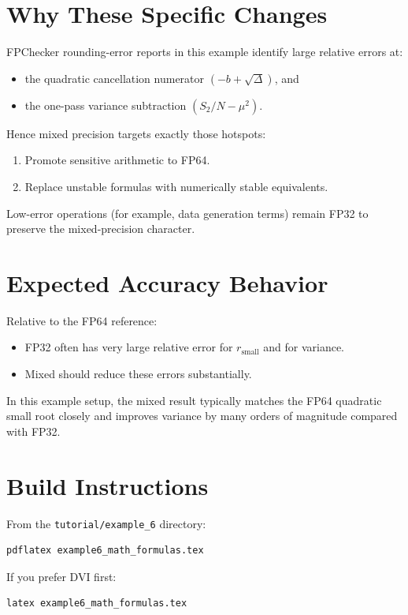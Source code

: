 \documentclass[11pt]{article}
\begin{document}
\section{Why These Specific Changes}
FPChecker rounding-error reports in this example identify large relative errors at:
\begin{itemize}
  \item the quadratic cancellation numerator \((-b+\sqrt{\Delta})\), and
  \item the one-pass variance subtraction \((S_2/N - \mu^2)\).
\end{itemize}

Hence mixed precision targets exactly those hotspots:
\begin{enumerate}
  \item Promote sensitive arithmetic to FP64.
  \item Replace unstable formulas with numerically stable equivalents.
\end{enumerate}

Low-error operations (for example, data generation terms) remain FP32 to preserve the mixed-precision character.

\section{Expected Accuracy Behavior}
Relative to the FP64 reference:
\begin{itemize}
  \item FP32 often has very large relative error for \(r_{\text{small}}\) and for variance.
  \item Mixed should reduce these errors substantially.
\end{itemize}

In this example setup, the mixed result typically matches the FP64 quadratic small root closely and improves variance by many orders of magnitude compared with FP32.

\section{Build Instructions}
From the \texttt{tutorial/example\_6} directory:
\begin{verbatim}
pdflatex example6_math_formulas.tex
\end{verbatim}
If you prefer DVI first:
\begin{verbatim}
latex example6_math_formulas.tex
\end{verbatim}
\end{document}
